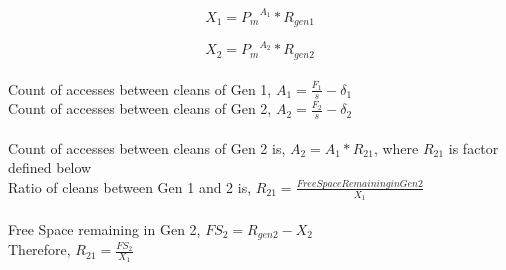 \begin{equation}X_1 = {P_m}^{A_1} * R_{gen1}\end{equation}

\begin{equation}X_2 = {P_m}^{A_2} * R_{gen2}\end{equation}
\\
Count of accesses between cleans of Gen 1, $A_1 = \frac{F_1}{s} - \delta_1$\\
Count of accesses between cleans of Gen 2, $A_2 = \frac{F_2}{s} - \delta_2$\\
\\
Count of accesses between cleans of Gen 2 is, $A_2 = A_1 * R_{21}$, where $R_{21}$ is factor defined below\\
Ratio of cleans between Gen 1 and 2 is, $R_{21} = \frac{Free Space Remaining in Gen 2}{X_1}$\\
\\
Free Space remaining in Gen 2, $FS_2 = R_{gen2} - X_2$\\
Therefore, $R_{21} = \frac{FS_2}{X_1}$\\

